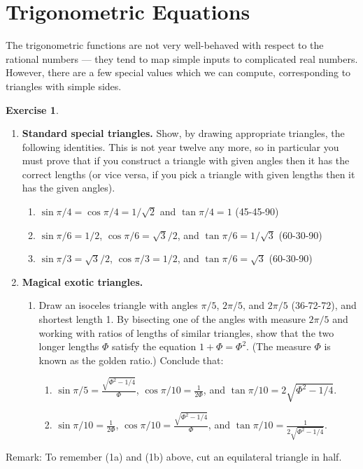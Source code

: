 \documentclass[a4paper,leqno]{article}
\numberwithin{equation}{section}
\theoremstyle{definition}
\newtheorem{exercise}[equation]{Exercise}
\theoremstyle{remark}
\begin{document}
\section{Trigonometric Equations}
The trigonometric functions are not very well-behaved with respect to the rational numbers --- they tend to map
simple inputs to complicated real numbers. However, there are a few special values which we can compute, corresponding
to triangles with simple sides.
\begin{exercise}\leavevmode\label{ex:specialtriangles}
  \begin{enumerate}
    \item \textbf{Standard special triangles.} Show, by drawing appropriate triangles, the following identities. This is not year twelve any more,
                                               so in particular you must prove that if you construct a triangle with given angles then it has the
                                               correct lengths (or vice versa, if you pick a triangle with given lengths then it has the given angles).
      \begin{enumerate}
        \item $ \sin \pi/4 = \cos \pi/4 = 1/\sqrt{2} $ and $ \tan \pi/4 = 1 $ (45-45-90)
        \item $ \sin \pi/6 = 1/2 $, $ \cos \pi/6 = \sqrt{3}/2 $, and $ \tan \pi/6 = 1/\sqrt{3} $ (60-30-90)
        \item $ \sin \pi/3 = \sqrt{3}/2 $, $ \cos \pi/3 = 1/2 $, and $ \tan \pi/6 = \sqrt{3} $ (60-30-90)
      \end{enumerate}
    \item \textbf{Magical exotic triangles.}
      \begin{enumerate}
        \item Draw an isoceles triangle with angles $ \pi/5 $, $ 2\pi/5 $, and $ 2\pi/5 $ (36-72-72), and shortest length 1. By bisecting
              one of the angles with measure $ 2\pi/5 $ and working with ratios of lengths of similar triangles, show that the
              two longer lengths $ \Phi $ satisfy the equation $ 1 + \Phi = \Phi^2 $. (The measure $ \Phi $ is known as the golden
              ratio.) Conclude that:
              \begin{enumerate}
                \item $ \sin \pi/5 = \frac{\sqrt{\Phi^2 - 1/4}}{\Phi} $, $ \cos \pi/10 = \frac{1}{2\Phi} $, and $ \tan \pi/10 = 2\sqrt{\Phi^2 - 1/4} $.
                \item $ \sin \pi/10 = \frac{1}{2\Phi} $, $ \cos \pi/10 = \frac{\sqrt{\Phi^2 - 1/4}}{\Phi} $, and $ \tan \pi/10 = \frac{1}{2\sqrt{\Phi^2 - 1/4}} $.
              \end{enumerate}
      \end{enumerate}
  \end{enumerate}
  Remark: To remember (1a) and (1b) above, cut an equilateral triangle in half.
\end{exercise}
\end{document}
